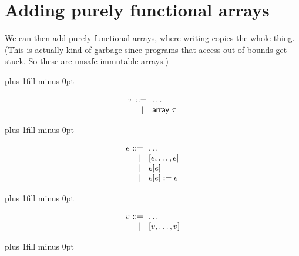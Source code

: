 \documentclass{article}
\newcommand{\bnfeq}{&::=&}
\newcommand{\bnfalt}{&~\mid&}
\newcommand{\kw}[1]{\ensuremath{\mathsf{#1}}}
\newcommand{\tyint}{\ensuremath{\kw{int}}}
\newcommand{\tyarray}{\ensuremath{\kw{array}}}
\newcommand{\COLON}{\mathrel{\,:\,}}
\newcommand{\hastype}[3]{\ensuremath{#1\mathrel{\,\vdash\,}#2 \COLON #3}}
\begin{document}
\clearpage

\section*{Adding purely functional arrays}

We can then add purely functional arrays, where writing copies the
whole thing. (This is actually kind of garbage since programs that
access out of bounds get stuck. So these are unsafe immutable arrays.)

{
\noindent
\hskip 1cm plus 1fill minus 0pt
\begin{varwidth}[t]{0.5\textwidth}
\[
\begin{array}{r@{~}c@{~~}l}
  \tau \bnfeq \ldots\\
       \bnfalt \tyarray\ \tau\\
\end{array}
\]
\end{varwidth}
\hskip 0pt plus 1fill minus 0pt
\begin{varwidth}[t]{0.5\textwidth}
\[
\begin{array}{r@{~}c@{~~}l}
  e \bnfeq     \ldots\\
    \bnfalt    [e, \ldots, e]\\
    \bnfalt    e[e]\\
    \bnfalt    e[e] := e\\
\end{array}
\]
\end{varwidth}
\hskip -1cm plus 1fill minus 0pt
\begin{varwidth}[t]{0.5\textwidth}
\[
\begin{array}{r@{~}c@{~~}l}
  v \bnfeq     \ldots\\
    \bnfalt    [v, \ldots, v]\\
\end{array}
\]
\end{varwidth}
\hskip 0pt plus 1fill minus 0pt
}

{
\def\MathparLineskip {\lineskiplimit=1.2em\lineskip=2.5em plus 0.2em}

{
\setlength{\fboxsep}{5pt}
\fbox{\hastype{\Gamma}{e}{\tau}}
}
}
\end{document}
